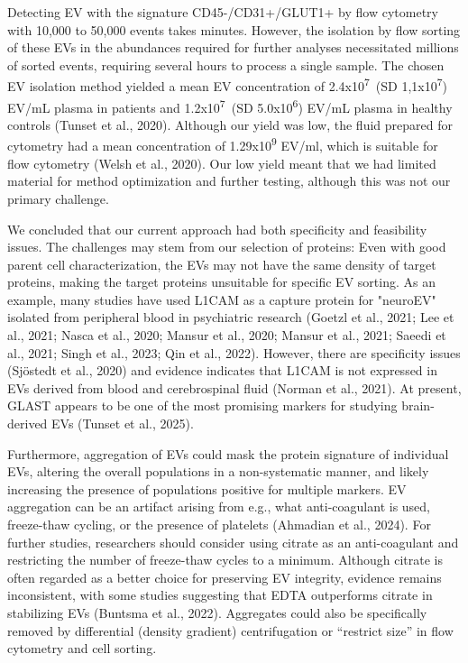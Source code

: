 \documentclass[authordate, empirical]{jote-new-article}
\begin{document}
	Detecting EV with the signature CD45-/CD31+/GLUT1+ by flow cytometry with 10,000 to 50,000 events takes minutes. However, the isolation by flow sorting of these EVs in the abundances required for further analyses necessitated millions of sorted events, requiring several hours to process a single sample. The chosen EV isolation method yielded a mean EV concentration of 2.4x10\textsuperscript{7} (SD 1,1x10\textsuperscript{7}) EV/mL plasma in patients and 1.2x10\textsuperscript{7} (SD 5.0x10\textsuperscript{6}) EV/mL plasma in healthy controls (Tunset et al., 2020). Although our yield was low, the fluid prepared for cytometry had a mean concentration of 1.29x10\textsuperscript{9} EV/ml, which is suitable for flow cytometry (Welsh et al., 2020). Our low yield meant that we had limited material for method optimization and further testing, although this was not our primary challenge. 



	We concluded that our current approach had both specificity and feasibility issues. The challenges may stem from our selection of proteins: Even with good parent cell characterization, the EVs may not have the same density of target proteins, making the target proteins unsuitable for specific EV sorting. As an example, many studies have used L1CAM as a capture protein for "neuroEV" isolated from peripheral blood in psychiatric research (Goetzl et al., 2021; Lee et al., 2021; Nasca et al., 2020; Mansur et al., 2020; Mansur et al., 2021; Saeedi et al., 2021; Singh et al., 2023; Qin et al., 2022). However, there are specificity issues (Sjöstedt et al., 2020) and evidence indicates that L1CAM is not expressed in EVs derived from blood and cerebrospinal fluid (Norman et al., 2021). At present, GLAST appears to be one of the most promising markers for studying brain-derived EVs (Tunset et al., 2025).



	Furthermore, aggregation of EVs could mask the protein signature of individual EVs, altering the overall populations in a non-systematic manner, and likely increasing the presence of populations positive for multiple markers. EV aggregation can be an artifact arising from e.g., what anti-coagulant is used, freeze-thaw cycling, or the presence of platelets (Ahmadian et al., 2024). For further studies, researchers should consider using citrate as an anti-coagulant and restricting the number of freeze-thaw cycles to a minimum. Although citrate is often regarded as a better choice for preserving EV integrity, evidence remains inconsistent, with some studies suggesting that EDTA outperforms citrate in stabilizing EVs (Buntsma et al., 2022). Aggregates could also be specifically removed by differential (density gradient) centrifugation or “restrict size” in flow cytometry and cell sorting.
\end{document}
